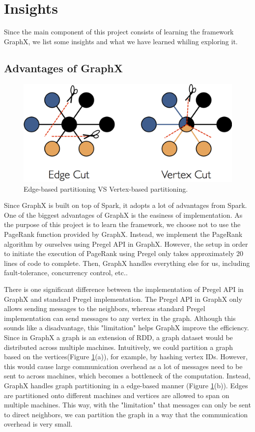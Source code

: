 \section{Insights} \label{sec:insights}
%
Since the main component of this project consists of learning the framework GraphX, we list some insights and what we have learned whiling exploring it.
%
\subsection{Advantages of GraphX}
%
\begin{figure}[t]
	\centering
	\includegraphics[width=0.7\linewidth]{edge_cut_vs_vertex_cut.png}
	\caption{Edge-based partitioning VS Vertex-based partitioning.}
	\label{fig:edgecut}
\end{figure}

Since GraphX is built on top of Spark, it adopts a lot of advantages from Spark.
%
One of the biggest advantages of GraphX is the easiness of implementation.
%
As the purpose of this project is to learn the framework, we choose not to use the PageRank function provided by GraphX.
%
Instead, we implement the PageRank algorithm by ourselves using Pregel API in GraphX.
%
However, the setup in order to initiate the execution of PageRank using Pregel only takes approximately 20 lines of code to complete.
%
Then, GraphX handles everything else for us, including fault-tolerance, concurrency control, etc..
%

There is one significant difference between the implementation of Pregel API in GraphX and standard Pregel implementation.
%
The Pregel API in GraphX only allows sending messages to the neighbors, whereas standard Pregel implementation can send messages to any vertex in the graph.
%
Although this sounds like a disadvantage, this "limitation" helps GraphX improve the efficiency.
%
Since in GraphX a graph is an extension of RDD, a graph dataset would be distributed across multiple machines.
%
Intuitively, we could partition a graph based on the vertices(Figure \ref{fig:edgecut}(a))\cite{TODO}, for example, by hashing vertex IDs. 
%
However, this would cause large communication overhead as a lot of messages need to be sent to across machines, which becomes a bottleneck of the computation.
%
Instead, GraphX handles graph partitioning in a edge-based manner (Figure \ref{fig:edgecut}(b)).
%
Edges are partitioned onto different machines and vertices are allowed to span on multiple machines.
%
This way, with the "limitation" that messages can only be sent to direct neighbors, we can partition the graph in a way that the communication overhead is very small.
%


